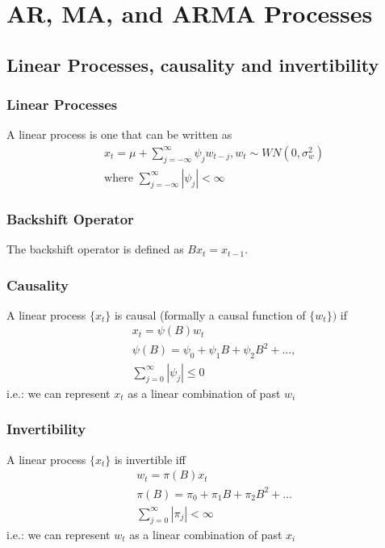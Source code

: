 \chapter{AR, MA, and ARMA Processes}

\section{Linear Processes, causality and invertibility} 

\subsection{Linear Processes}
A linear process is one that can be written as 
    \begin{align*}
        & x_t = \mu + \sum_{j=-\infty}^{\infty} \psi_j w_{t-j}, w_t \sim WN(0, \sigma^2_w)\\
        & \textrm{where } \sum_{j=-\infty}^{\infty} |\psi_j| < \infty
    \end{align*}

\subsection{Backshift Operator} 
The backshift operator is defined as $Bx_t = x_{t-1}$.

\subsection{Causality}
A linear process $\{ x_t \}$ is causal (formally a causal function of $\{w_t \})$ if
    \begin{align*}
        & x_t = \psi(B)w_t\\
        & \psi(B) = \psi_0 + \psi_1B + \psi_2 B^2 +..., \\
        & \sum_{j=0}^\infty |\psi_j| \leq 0
    \end{align*}
i.e.: we can represent $x_t$ as a linear combination of past $w_{i}$


\subsection{Invertibility} 
A linear process $\{ x_t \}$ is invertible iff
    \begin{align*}
        & w_t = \pi(B)x_t \\
        & \pi(B) = \pi_0 + \pi_1 B + \pi_2 B^2 + ... \\
        & \sum_{j=0}^\infty |\pi_j| < \infty 
    \end{align*}
i.e.: we can represent $w_t$ as a linear combination of past $x_i$





